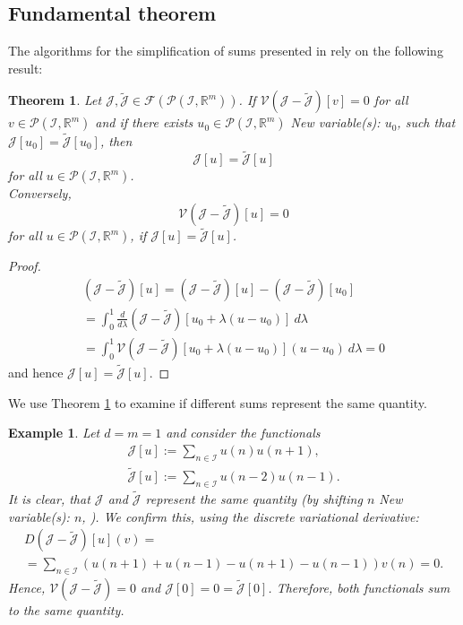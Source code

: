 \documentclass[sigconf,twocolumn]{acmart}
\newcommand{\1}{{\chi}}
\numberwithin{equation}{section}
\theoremstyle{thmlemcorr}
\numberwithin{theorem}{section}
\theoremstyle{thmlemcorr*}
\theoremstyle{defi}
\theoremstyle{remexample}
\newtheorem{example}[theorem]{Example}
\newtheorem{teo}[theorem]{Theorem}
\theoremstyle{ass}
\begin{document}
\subsection*{Fundamental theorem}
The algorithms for the simplification of sums presented in \cite{gomes20} rely on the following result:
\begin{teo}\label{theo1}
	Let \(\mathcal{J},\tilde{\mathcal{J}}\in \mathcal{F}(\mathcal{P}({\mathcal{I}},{\mathbb{R}}^m))\). If \(\mathcal{V}(\mathcal{J}-\tilde{\mathcal{J}})[v]=0\) for all \(v\in\mathcal{P}({\mathcal{I}},{\mathbb{R}}^m)\) and if there exists \(u_0\in\mathcal{P}({\mathcal{I}},{\mathbb{R}}^m)\)
{\color{blue} New variable(s): \(u_0\),  }
 such that \(\mathcal{J}[u_0]=\tilde{\mathcal{J}}[u_0]\), then
	\begin{equation*}
		\mathcal{J}[u]=\tilde{\mathcal{J}}[u]
	\end{equation*}
	for all \(u\in\mathcal{P}({\mathcal{I}},{\mathbb{R}}^m)\).\\
	Conversely,
	\begin{equation*}
		 \mathcal{V}(\mathcal{J}-\tilde{\mathcal{J}})[u]=0
	\end{equation*}
	for all \(u\in\mathcal{P}({\mathcal{I}},{\mathbb{R}}^m)\), if \(\mathcal{J}[u]=\tilde{\mathcal{J}}[u]\).
\end{teo}
\begin{proof}
	\begin{gather*}
		(\mathcal{J}-\tilde{\mathcal{J}})[u]=(\mathcal{J}-\tilde{\mathcal{J}})[u]-(\mathcal{J}-\tilde{\mathcal{J}})[u_0]\\
		=\int_{0}^{1}\frac{d}{d\lambda}(\mathcal{J}-\tilde{\mathcal{J}})[u_0+\lambda(u-u_0)]\ d\lambda\\
		=\int_{0}^{1}\mathcal{V}(\mathcal{J}-\tilde{\mathcal{J}})[u_0+\lambda(u-u_0)](u-u_0)\ d\lambda=0
	\end{gather*}
	and hence \(\mathcal{J}[u]=\tilde{\mathcal{J}}[u]\).
\end{proof}
We use Theorem \ref{theo1} to examine if different sums represent the same quantity.
\begin{example}
	Let \(d=m=1\) and consider the functionals
	\begin{gather*}
		\mathcal{J}[u]:=\sum_{n\in{\mathcal{I}}}u(n)u(n+1),\\
		\tilde{\mathcal{J}}[u]:=\sum_{n\in{\mathcal{I}}}u(n-2)u(n-1).
	\end{gather*}
	It is clear, that \(\mathcal{J}\) and \(\tilde{\mathcal{J}}\) represent the same quantity (by shifting \(n\)
{\color{blue} New variable(s): \(n\),  }
). We confirm this, using the discrete variational derivative:
	\begin{gather*}
		D(\mathcal{J}-\tilde{\mathcal{J}})[u](v)=\\
		=\sum_{n\in{\mathcal{I}}}(u(n+1)+u(n-1)-u(n+1)-u(n-1))v(n)=0.
	\end{gather*}
	Hence, \(\mathcal{V}(\mathcal{J}-\tilde{\mathcal{J}})=0\) and \(\mathcal{J}[0]=0=\tilde{\mathcal{J}}[0]\). Therefore, both functionals sum to the same quantity.
\end{example}
\end{document}
